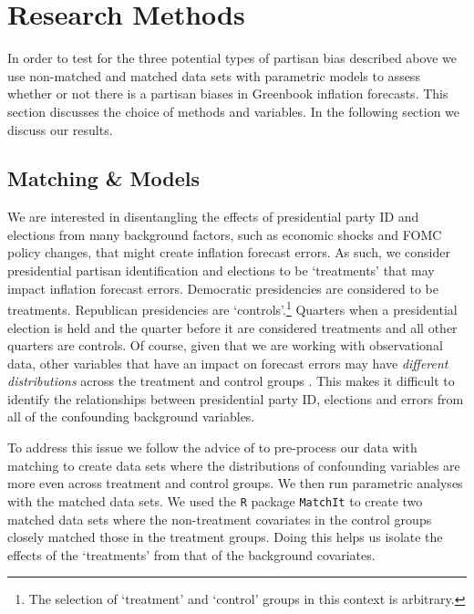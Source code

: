 \documentclass[a4paper]{article}\usepackage{graphicx, color}
\begin{document}

\section{Research Methods}

In order to test for the three potential types of partisan bias described above we use non-matched and matched data sets with parametric models \citep[see][]{Ho2007} to assess whether or not there is a partisan biases in Greenbook inflation forecasts. This section discusses the choice of methods and variables. In the following section we discuss our results.

\subsection{Matching \& Models}

We are interested in disentangling the effects of presidential party ID and elections from many background factors, such as economic shocks and FOMC policy changes, that might create inflation forecast errors. As such, we consider presidential partisan identification and elections to be `treatments' that may impact inflation forecast errors. Democratic presidencies are considered to be treatments. Republican presidencies are `controls'.\footnote{The selection of `treatment' and `control' groups in this context is arbitrary.} Quarters when a presidential election is held and the quarter before it are considered treatments and all other quarters are controls. Of course, given that we are working with observational data, other variables that have an impact on forecast errors may have {\emph{different distributions}} across the treatment and control groups \citep{Cochran1973, Diamond2012}. This makes it difficult to identify the relationships between presidential party ID, elections and errors from all of the confounding background variables.

To address this issue we follow the advice of \cite{Ho2007} to pre-process our data with matching to create data sets where the distributions of confounding variables are more even across treatment and control groups. We then run parametric analyses with the matched data sets. We used the {\tt{R}} package {\tt{MatchIt}} \citep{matchit2011} to create two matched data sets where the non-treatment covariates in the control groups closely matched those in the treatment groups. Doing this helps us isolate the effects of the `treatments' from that of the background covariates.
\end{document}

